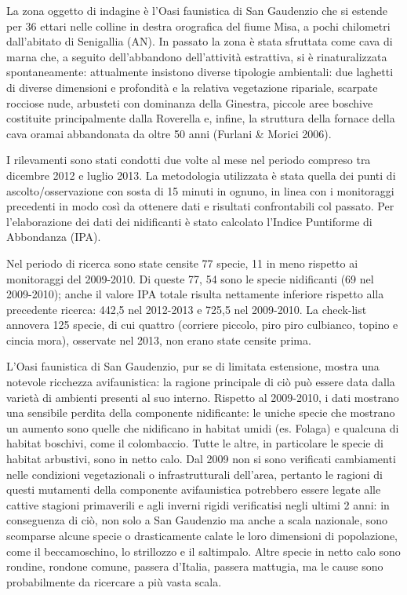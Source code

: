 La zona oggetto di indagine \`e l{\textquoteright}Oasi faunistica di San
Gaudenzio che si estende per 36 ettari nelle colline in destra
orografica del fiume Misa, a pochi chilometri
dall{\textquoteright}abitato di Senigallia (AN). In passato la zona \`e
stata sfruttata come cava di marna che, a seguito
dell{\textquoteright}abbandono dell{\textquoteright}attivit\`a
estrattiva, si \`e rinaturalizzata spontaneamente: attualmente
insistono diverse tipologie ambientali: due laghetti di diverse
dimensioni e profondit\`a e la relativa vegetazione ripariale, scarpate
rocciose nude, arbusteti con dominanza della Ginestra, piccole aree
boschive costituite principalmente dalla Roverella e, infine, la
struttura della fornace della cava oramai abbandonata da oltre 50 anni
(Furlani \& Morici 2006).

I rilevamenti sono stati condotti due volte al mese nel periodo compreso
tra dicembre 2012 e luglio 2013. La metodologia utilizzata \`e stata
quella dei punti di ascolto/osservazione con sosta di 15 minuti in
ognuno, in linea con i monitoraggi precedenti in modo cos\`i da
ottenere dati e risultati confrontabili col passato. Per
l{\textquoteright}elaborazione dei dati dei nidificanti \`e stato
calcolato l{\textquoteright}Indice Puntiforme di Abbondanza (IPA).

Nel periodo di ricerca sono state censite 77 specie, 11 in meno rispetto
ai monitoraggi del 2009-2010. Di queste 77, 54 sono le specie
nidificanti (69 nel 2009-2010); anche il valore IPA totale risulta
nettamente inferiore rispetto alla precedente ricerca: 442,5 nel
2012-2013 e 725,5 nel 2009-2010. La check-list annovera 125 specie, di
cui quattro (corriere piccolo, piro piro culbianco, topino e cincia
mora), osservate nel 2013, non erano state censite prima.

L{\textquoteright}Oasi faunistica di San Gaudenzio, pur se di limitata
estensione, mostra una notevole ricchezza avifaunistica: la ragione
principale di ci\`o pu\`o essere data dalla variet\`a di ambienti
presenti al suo interno. Rispetto al 2009-2010, i dati mostrano una
sensibile perdita della componente nidificante: le uniche specie che
mostrano un aumento sono quelle che nidificano in habitat umidi (es.
Folaga) e qualcuna di habitat boschivi, come il colombaccio. Tutte le
altre, in particolare le specie di habitat arbustivi, sono in netto
calo. Dal 2009 non si sono verificati cambiamenti nelle condizioni
vegetazionali o infrastrutturali dell{\textquoteright}area, pertanto le
ragioni di questi mutamenti della componente avifaunistica potrebbero
essere legate alle cattive stagioni primaverili e agli inverni rigidi
verificatisi negli ultimi 2 anni: in conseguenza di ci\`o, non solo a
San Gaudenzio ma anche a scala nazionale, sono scomparse alcune specie
o drasticamente calate le loro dimensioni di popolazione, come il
beccamoschino, lo strillozzo e il saltimpalo. Altre specie in netto
calo sono rondine, rondone comune, passera d{\textquoteright}Italia,
passera mattugia, ma le cause sono probabilmente da ricercare a pi\`u
vasta scala. 

